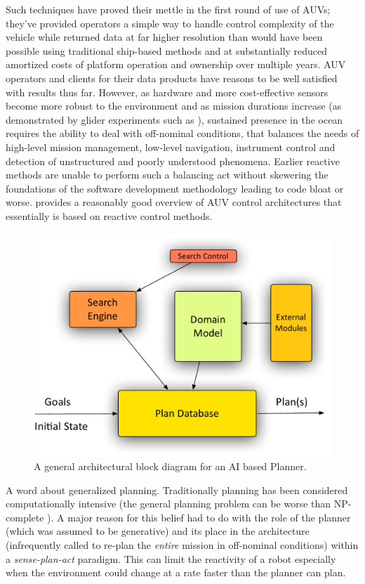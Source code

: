 Such techniques have proved their mettle in the first round of use of
AUVs; they've provided operators a simple way to handle control
complexity of the vehicle while returned data at far higher resolution
than would have been possible using traditional ship-based methods and
at substantially reduced amortized costs of platform operation and
ownership over multiple years. AUV operators and clients for their
data products have reasons to be well satisfied with results thus
far. However, as hardware and more cost-effective sensors become more
robust to the environment and as mission durations increase (as
demonstrated by glider experiments such as \cite{rucool11}), sustained
presence in the ocean requires the ability to deal with off-nominal
conditions, that balances the needs of high-level mission management,
low-level navigation, instrument control and detection of unstructured
and poorly understood phenomena. Earlier reactive methods are unable
to perform such a balancing act without skewering the foundations of
the software development methodology leading to code bloat or worse.
\cite{carreras06} provides a reasonably good overview of AUV control
architectures that essentially is based on reactive control methods.

\begin{figure}[htpb]
 \centering
 \includegraphics[scale=0.3]{figs/planner-arch.pdf}
 \caption{\small A general architectural block diagram for an AI based
   Planner.}
 \label{fig:planner}
\end{figure}

A word about generalized planning. Traditionally planning has been
considered computationally intensive (the general planning problem can
be worse than NP-complete \cite{ghallab04}). A major reason for this
belief had to do with the role of the planner (which was assumed to be
generative) and its place in the architecture (infrequently called to
re-plan the \emph{entire} mission in off-nominal conditions) within a
\emph{sense-plan-act} paradigm. This can limit the reactivity of a
robot especially when the environment could change at a rate faster
than the planner can plan.  

